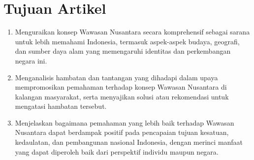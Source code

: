 \section{Tujuan Artikel}
\begin{enumerate}
\item Menguraikan konsep Wawasan Nusantara secara komprehensif sebagai sarana untuk lebih memahami Indonesia, termasuk aspek-aspek budaya, geografi, dan sumber daya alam yang memengaruhi identitas dan perkembangan negara ini.
\item Menganalisis hambatan dan tantangan yang dihadapi dalam upaya mempromosikan pemahaman terhadap konsep Wawasan Nusantara di kalangan masyarakat, serta menyajikan solusi atau rekomendasi untuk mengatasi hambatan tersebut.
\item Menjelaskan bagaimana pemahaman yang lebih baik terhadap Wawasan Nusantara dapat berdampak positif pada pencapaian tujuan kesatuan, kedaulatan, dan pembangunan nasional Indonesia, dengan merinci manfaat yang dapat diperoleh baik dari perspektif individu maupun negara.
\end{enumerate}

